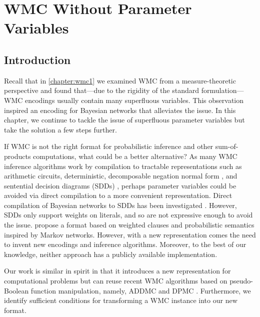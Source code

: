 \chapter{WMC Without Parameter Variables}\label{chapter:wmc2}

\section{Introduction}

Recall that in \cref{chapter:wmc1} we examined WMC from a measure-theoretic
perspective and found that---due to the rigidity of the standard
formulation---WMC encodings usually contain many superfluous variables. This
observation inspired an encoding for Bayesian networks that alleviates the
issue. In this chapter, we continue to tackle the issue of superfluous parameter
variables but take the solution a few steps further.

If WMC is not the right format for probabilistic inference and other
sum-of-products computations, what could be a better alternative? As many WMC
inference algorithms \citep{DBLP:conf/ecai/Darwiche04,DBLP:conf/ijcai/OztokD15}
work by compilation to tractable representations such as arithmetic circuits,
deterministic, decomposable negation normal form
\citep{DBLP:journals/jancl/Darwiche01}, and sentential decision diagrams (SDDs)
\citep{DBLP:conf/ijcai/Darwiche11}, perhaps parameter variables could be avoided
via direct compilation to a more convenient representation. Direct compilation
of Bayesian networks to SDDs has been investigated
\citep{DBLP:conf/ecsqaru/ChoiKD13}. However, SDDs only support weights on
literals, and so are not expressive enough to avoid the issue.
 propose a format based on weighted clauses and
probabilistic semantics inspired by Markov networks. However, with a new
representation comes the need to invent new encodings and inference algorithms.
Moreover, to the best of our knowledge, neither approach
\citep{DBLP:conf/ecsqaru/ChoiKD13,DBLP:conf/uai/GogateD10} has a publicly
available implementation.


Our work is similar in spirit in that it introduces a new
representation for computational problems but can reuse recent WMC algorithms
based on pseudo-Boolean function manipulation, namely, \textsc{ADDMC}
\citep{DBLP:conf/aaai/DudekPV20} and \textsc{DPMC}
\citep{DBLP:conf/cp/DudekPV20}. Furthermore, we identify sufficient conditions
for transforming a WMC instance into our new format.

